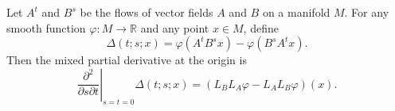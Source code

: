 Let $A^t$ and $B^s$ be the flows of vector fields $A$ and $B$ on a manifold $M$. For any smooth function $\varphi: M \to \mathbb{R}$ and any point $x \in M$, define
$$\Delta(t; s; x) = \varphi(A^t B^s x) - \varphi(B^s A^t x).$$
Then the mixed partial derivative at the origin is
$$\left. \frac{\partial^2}{\partial s \partial t} \right|_{s=t=0} \Delta(t; s; x) = \left( L_B L_A \varphi - L_A L_B \varphi \right)(x).$$
